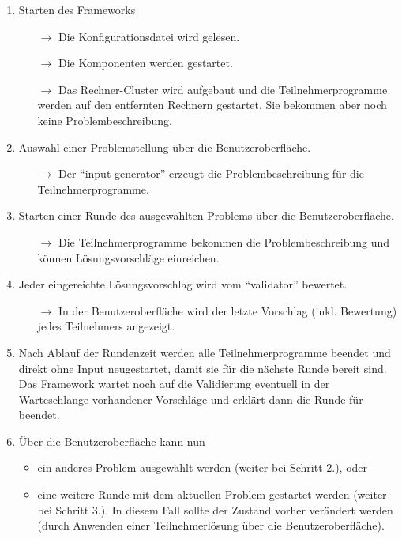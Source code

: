\documentclass[a4paper, 12pt]{article}
\begin{document}
\begin{enumerate}
  \item Starten des Frameworks
        \begin{itemize}
          \item[\(\rightarrow\)] Die Konfigurationsdatei wird gelesen.
          \item[\(\rightarrow\)] Die Komponenten werden gestartet.
          \item[\(\rightarrow\)] Das Rechner-Cluster wird aufgebaut und die
            Teilnehmerprogramme werden auf den entfernten Rechnern gestartet.
            Sie bekommen aber noch keine Problembeschreibung.
        \end{itemize}

  \item Auswahl einer Problemstellung über die Benutzeroberfläche.
        \begin{itemize}
          \item[\(\rightarrow\)] Der ``input generator'' erzeugt die
            Problembeschreibung für die Teilnehmerprogramme.
        \end{itemize}

  \item Starten einer Runde des ausgewählten Problems über die
        Benutzeroberfläche.
        \begin{itemize}
          \item[\(\rightarrow\)] Die Teilnehmerprogramme bekommen die
            Problembeschreibung und können Lösungsvorschläge einreichen.
        \end{itemize}

  \item Jeder eingereichte Lösungsvorschlag wird vom ``validator'' bewertet.
        \begin{itemize}
          \item[\(\rightarrow\)] In der Benutzeroberfläche wird der letzte
            Vorschlag (inkl. Bewertung) jedes Teilnehmers angezeigt.
        \end{itemize}

  \item Nach Ablauf der Rundenzeit werden alle Teilnehmerprogramme beendet und
    direkt ohne Input neugestartet, damit sie für die nächste Runde bereit sind.
    Das Framework wartet noch auf die Validierung eventuell in der Warteschlange
    vorhandener Vorschläge und erklärt dann die Runde für beendet.

  \item Über die Benutzeroberfläche kann nun
        \begin{itemize}
          \item ein anderes Problem ausgewählt werden (weiter bei Schritt 2.),
            oder
          \item eine weitere Runde mit dem aktuellen Problem gestartet werden
            (weiter bei Schritt 3.).
            In diesem Fall sollte der Zustand vorher verändert werden (durch
            Anwenden einer Teilnehmerlösung über die Benutzeroberfläche).
        \end{itemize}

\end{enumerate}
\end{document}
